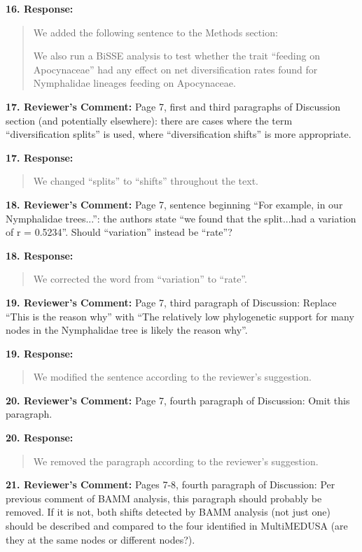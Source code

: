 \documentclass[]{article}
\begin{document}
\textbf{16. Response:}

\begin{quote}
\color{blue}
We added the following sentence to the Methods section:

We also run a BiSSE analysis
to test whether the trait ``feeding on Apocynaceae'' had any effect on
net diversification rates found for Nymphalidae lineages feeding on
Apocynaceae.
\end{quote}


\textbf{17. Reviewer's Comment:}
Page 7, first and third paragraphs of Discussion section (and potentially elsewhere): there are cases where the term “diversification splits” is used, where “diversification shifts” is more appropriate.

\textbf{17. Response:}

\begin{quote}
\color{blue}
We changed ``splits'' to ``shifts'' throughout the text.
\end{quote}


\textbf{18. Reviewer's Comment:}
Page 7, sentence beginning “For example, in our Nymphalidae trees...”: the authors state “we found that the split...had a variation of r = 0.5234”. Should “variation” instead be “rate”?

\textbf{18. Response:}

\begin{quote}
\color{blue}
We corrected the word from ``variation'' to ``rate''.
\end{quote}


\textbf{19. Reviewer's Comment:}
Page 7, third paragraph of Discussion: Replace “This is the reason why” with
“The relatively low phylogenetic support for many nodes in the Nymphalidae tree
is likely the reason why”.

\textbf{19. Response:}

\begin{quote}
\color{blue}
We modified the sentence according to the reviewer's suggestion.
\end{quote}


\textbf{20. Reviewer's Comment:}
Page 7, fourth paragraph of Discussion: Omit this paragraph.

\textbf{20. Response:}

\begin{quote}
\color{blue}
We removed the paragraph according to the reviewer's suggestion.
\end{quote}


\textbf{21. Reviewer's Comment:}
Pages 7-8, fourth paragraph of Discussion: Per previous comment of BAMM analysis, this paragraph should probably be removed. If it is not, both shifts detected by BAMM analysis (not just one) should be described and compared to the four identified in MultiMEDUSA (are they at the same nodes or different nodes?).
\end{document}
